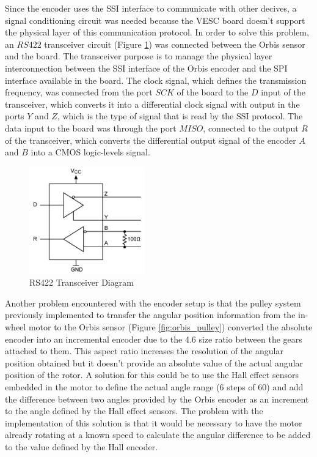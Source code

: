 Since the encoder uses the \ac{SSI} interface to communicate with other decives, a signal conditioning circuit was needed because the VESC board doesn't support the physical layer of this communication protocol. In order to solve this problem, an $RS422$ transceiver circuit (Figure \ref{fig:rs422}) was connected between the Orbis sensor and the board. The transceiver purpose is to manage the physical layer interconnection between the \ac{SSI} interface of the Orbis encoder and the \ac{SPI} interface available in the board. The clock signal, which defines the transmission frequency, was connected from the port $SCK$ of the board to the $D$ input of the transceiver, which converts it into a differential clock signal with output in the ports $Y$ and $Z$, which is the type of signal that is read by the \ac{SSI} protocol. The data input to the board was through the port $MISO$, connected to the output $R$ of the transceiver, which converts the differential output signal of the encoder $A$ and $B$ into a CMOS logic-levels signal.

\begin{figure}[htbp]
\centering
\includegraphics[width=5cm]{Images/rs422.png} 
\caption[RS422 Transceiver Diagram]{RS422 Transceiver Diagram}
\label{fig:rs422}
\end{figure}

Another problem encountered with the encoder setup is that the pulley system previously implemented to transfer the angular position information from the in-wheel motor to the Orbis sensor (Figure \ref{fig:orbis_pulley}) converted the absolute encoder into an incremental encoder due to the 4.6 size ratio between the gears attached to them. This aspect ratio increases the resolution of the angular position obtained but it doesn't provide an absolute value of the actual angular position of the rotor. A solution for this could be to use the Hall effect sensors embedded in the motor to define the actual angle range (6 steps of 60\degree) and add the difference between two angles provided by the Orbis encoder as an increment to the angle defined by the Hall effect sensors. The problem with the implementation of this solution is that it would be necessary to have the motor already rotating at a known speed to calculate the angular difference to be added to the value defined by the Hall encoder.

